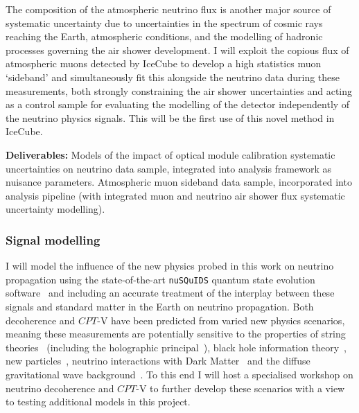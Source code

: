 \documentclass[a4paper,11pt]{article}
\begin{document}
The composition of the atmospheric neutrino flux is another major source of systematic uncertainty due to uncertainties in the spectrum of cosmic rays reaching the Earth, atmospheric conditions, and the modelling of hadronic processes governing the air shower development. I will exploit the copious flux of atmospheric muons detected by IceCube to develop a high statistics muon `sideband' and simultaneously fit this alongside the neutrino data during these measurements, both strongly constraining the air shower uncertainties and acting as a control sample for evaluating the modelling of the detector independently of the neutrino physics signals. This will be the first use of this novel method in IceCube. 


\textbf{Deliverables:} Models of the impact of optical module calibration systematic uncertainties on neutrino data sample, integrated into analysis framework as nuisance parameters. Atmospheric muon sideband data sample, incorporated into analysis pipeline (with integrated muon and neutrino air shower flux systematic uncertainty modelling).  \\

\subsubsection{Signal modelling}

I will model the influence of the new physics probed in this work on neutrino propagation using the state-of-the-art \texttt{nuSQuIDS} quantum state evolution software~\cite{Delgado:2014kpa, nusquidsGIT} and including an accurate treatment of the interplay between these signals and standard matter in the Earth on neutrino propagation. Both decoherence and $CPT$-V have been predicted from varied new physics scenarios, meaning these measurements are potentially sensitive to the properties of string theories~\cite{Mavromatos2010, AmelinoCamelia:2008qg} (including the holographic principal~\cite{Perlman_2015, Harlow:2018jwu}), black hole information theory~\cite{PhysRevD.102.115003, Hellmann:2021jyz}, new particles~\cite{Hellmann:2021jyz}, neutrino interactions with Dark Matter~\cite{1909.11271, EPJC802020, Capozzi:2018bps, 1904.02518} and the diffuse gravitational wave background~\cite{PhysRevD.100.096014}. To this end I will host a specialised workshop on neutrino decoherence and $CPT$-V to further develop these scenarios with a view to testing additional models in this project.
\end{document}

